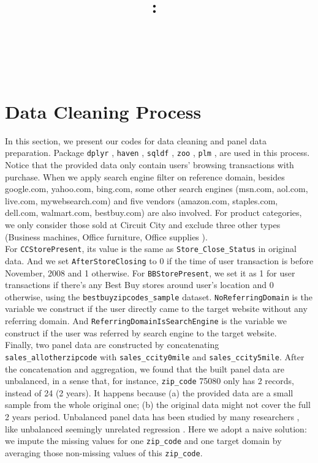 \documentclass{article}
\title{
    \vspace{2in}
    \textmd{\textbf{\hmwkClasstwo:\ \\ \hmwkTitle}}\\
    \vspace{1in}\large{\textit{\hmwkClassInstructor}}
    \vspace{2in}
}
\author{\hmwkAuthorName
\  \\ \hmwkID
\vspace{0.3in}}
\date{}
\begin{document}
\maketitle

\pagebreak

\tableofcontents
\listoffigures
\listoftables
\lstlistoflistings 
\pagebreak

\section{Data Cleaning Process}
In this section, we present our codes for data cleaning and panel data preparation. Package \texttt{dplyr} \cite{wickham2015dplyr}, \texttt{haven} \cite{wickham2018haven}, \texttt{sqldf} \cite{grothendieck2017sqldf}, \texttt{zoo} \cite{zeileis2005zoo}, \texttt{plm} \cite{croissant2008panel}, are used in this process. \\
Notice that the provided data only contain users' browsing transactions with purchase. When we apply search engine filter on reference domain, besides google.com, yahoo.com, bing.com, some other search engines (msn.com, aol.com, live.com, mywebsearch.com) and five vendors (amazon.com, staples.com, dell.com, walmart.com, bestbuy.com) are also involved. For product categories, we only consider those sold at Circuit City and exclude three other types (Business machines, Office furniture, Office supplies
).\\
For \texttt{CCStorePresent}, its value is the same as \texttt{Store\_Close\_Status} in original data. And we set \texttt{AfterStoreClosing} to 0 if the time of user transaction is before November, 2008 and 1 otherwise. For \texttt{BBStorePresent}, we set it as 1 for user transactions if there's any Best Buy stores around user's location and 0 otherwise, using the \texttt{bestbuyzipcodes\_sample} dataset. \texttt{NoReferringDomain} is the variable we construct if the user directly came to the target website without any referring domain. And \texttt{ReferringDomainIsSearchEngine} is the variable we construct if the user was referred by search engine to the target website.\\
Finally, two panel data are constructed by concatenating \texttt{sales\_allotherzipcode} with \texttt{sales\_ccity0mile} and \texttt{sales\_ccity5mile}. After the concatenation and aggregation, we found that the built panel data are unbalanced, in a sense that, for instance, \texttt{zip\_code} 75080 only has 2 records, instead of 24 (2 years). It happens because (a) the provided data are a small sample from the whole original one; (b) the original data might not cover the full 2 years period. Unbalanced panel data has been studied by many researchers \cite{baltagi2006unbalanced}, like unbalanced seemingly unrelated regression \cite{mcdowell2004help}. Here we adopt a naive solution: we impute the missing values for one \texttt{zip\_code} and one target domain by averaging those non-missing values of this \texttt{zip\_code}.
\end{document}

